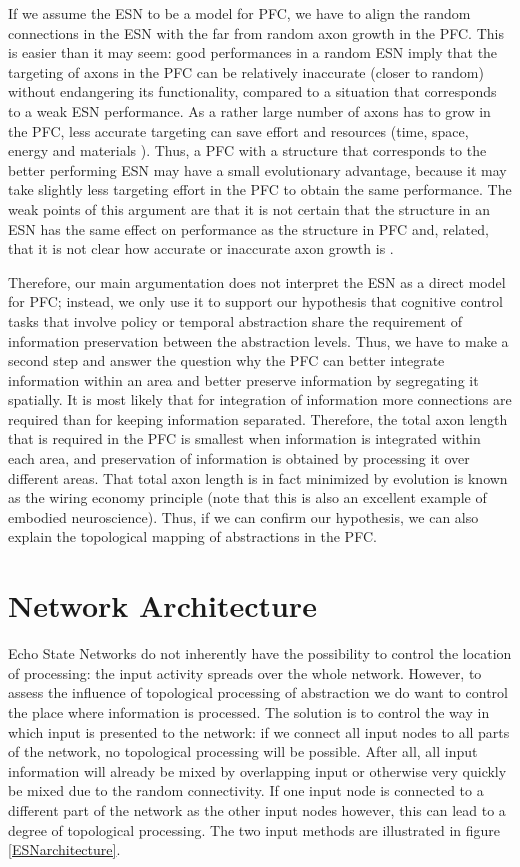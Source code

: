 \documentclass[10pt,a4paper]{report}
\begin{document}
If we assume the ESN to be a model for PFC, we have to align the random connections in the ESN with the far from random axon growth in the PFC. This is easier than it may seem: good performances in a random ESN imply that the targeting of axons in the PFC can be relatively inaccurate (closer to random) without endangering its functionality, compared to a situation that corresponds to a weak ESN performance. As a rather large number of axons has to grow in the PFC, less accurate targeting can save effort and resources (time, space, energy and materials \citep{Sporns2010}). Thus, a PFC with a structure that corresponds to the better performing ESN may have a small evolutionary advantage, because it may take slightly less targeting effort in the PFC to obtain the same performance. The weak points of this argument are that it is not certain that the structure in an ESN has the same effect on performance as the structure in PFC and, related, that it is not clear how accurate or inaccurate axon growth is \citep{O'Donnell2009}.

Therefore, our main argumentation does not interpret the ESN as a direct model for PFC; instead, we only use it to support our hypothesis that cognitive control tasks that involve policy or temporal abstraction share the requirement of information preservation between the abstraction levels. Thus, we have to make a second step and answer the question why the PFC can better integrate information within an area and better preserve information by segregating it spatially. It is most likely that for integration of information more connections are required than for keeping information separated. Therefore, the total axon length that is required in the PFC is smallest when information is integrated within each area, and preservation of information is obtained by processing it over different areas. That total axon length is in fact minimized by evolution is known as the wiring economy principle \citep{Allman2000, Cherniak1994, Sporns2010} (note that this is also an excellent example of embodied neuroscience). Thus, if we can confirm our hypothesis, we can also explain the topological mapping of abstractions in the PFC.

\section{Network Architecture}

Echo State Networks do not inherently have the possibility to control the location of processing: the input activity spreads over the whole network. However, to assess the influence of topological processing of abstraction we do want to control the place where information is processed. The solution is to control the way in which input is presented to the network: if we connect all input nodes to all parts of the network, no topological processing will be possible. After all, all input information will already be mixed by overlapping input or otherwise very quickly be mixed due to the random connectivity. If one input node is connected to a different part of the network as the other input nodes however, this can lead to a degree of topological processing. The two input methods are illustrated in figure  \ref{ESNarchitecture}.
\end{document}
